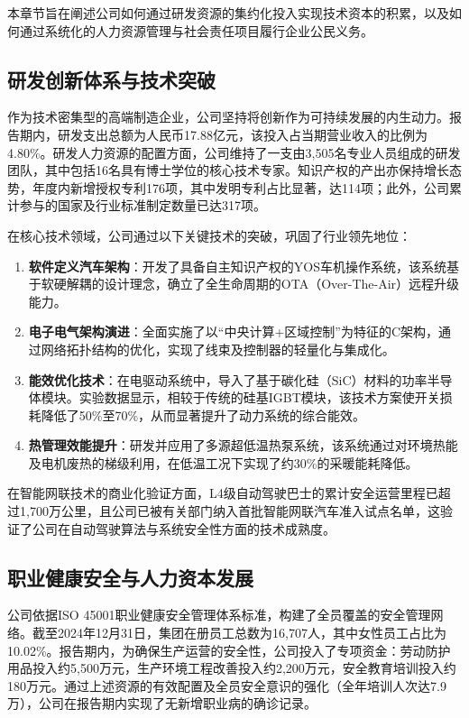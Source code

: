 \documentclass[a4paper,12pt]{article}
\begin{document}
本章节旨在阐述公司如何通过研发资源的集约化投入实现技术资本的积累，以及如何通过系统化的人力资源管理与社会责任项目履行企业公民义务。

\subsection{研发创新体系与技术突破}
作为技术密集型的高端制造企业，公司坚持将创新作为可持续发展的内生动力。报告期内，研发支出总额为人民币17.88亿元，该投入占当期营业收入的比例为4.80\%。研发人力资源的配置方面，公司维持了一支由3,505名专业人员组成的研发团队，其中包括16名具有博士学位的核心技术专家。知识产权的产出亦保持增长态势，年度内新增授权专利176项，其中发明专利占比显著，达114项；此外，公司累计参与的国家及行业标准制定数量已达317项。

在核心技术领域，公司通过以下关键技术的突破，巩固了行业领先地位：
\begin{enumerate}
    \item \textbf{软件定义汽车架构}：开发了具备自主知识产权的YOS车机操作系统，该系统基于软硬解耦的设计理念，确立了全生命周期的OTA（Over-The-Air）远程升级能力。
    \item \textbf{电子电气架构演进}：全面实施了以“中央计算+区域控制”为特征的C架构，通过网络拓扑结构的优化，实现了线束及控制器的轻量化与集成化。
    \item \textbf{能效优化技术}：在电驱动系统中，导入了基于碳化硅（SiC）材料的功率半导体模块。实验数据显示，相较于传统的硅基IGBT模块，该技术方案使开关损耗降低了50\%至70\%，从而显著提升了动力系统的综合能效。
    \item \textbf{热管理效能提升}：研发并应用了多源超低温热泵系统，该系统通过对环境热能及电机废热的梯级利用，在低温工况下实现了约30\%的采暖能耗降低。
\end{enumerate}

在智能网联技术的商业化验证方面，L4级自动驾驶巴士的累计安全运营里程已超过1,700万公里，且公司已被有关部门纳入首批智能网联汽车准入试点名单，这验证了公司在自动驾驶算法与系统安全性方面的技术成熟度。

\subsection{职业健康安全与人力资本发展}
公司依据ISO 45001职业健康安全管理体系标准，构建了全员覆盖的安全管理网络。截至2024年12月31日，集团在册员工总数为16,707人，其中女性员工占比为10.02\%。报告期内，为确保生产运营的安全性，公司投入了专项资金：劳动防护用品投入约5,500万元，生产环境工程改善投入约2,200万元，安全教育培训投入约180万元。通过上述资源的有效配置及全员安全意识的强化（全年培训人次达7.9万），公司在报告期内实现了无新增职业病的确诊记录。
\end{document}
